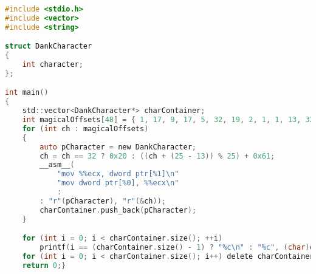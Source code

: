 \headerfooteroff{}
\pagecolor{black!5}\afterpage{\nopagecolor}
\begin{lstlisting}[language=C]
#include <stdio.h>
#include <vector>
#include <string>

struct DankCharacter
{
	int character;
};

int main()
{
	std::vector<DankCharacter*> charContainer;
	int magicalOffsets[48] = { 1, 17, 9, 17, 5, 32, 19, 2, 1, 1, 13, 32, 19, 21, 9, 17, 32, 12, 2, 8, 32, 8, 3, 32, 1, 17, 9, 17, 5, 32, 19, 2, 1, 1, 13, 32, 24, 17, 7, 32, 12, 2, 8, 32, 16, 2, 10, 1 };
	for (int ch : magicalOffsets)
	{
		auto pCharacter = new DankCharacter;
		ch = ch == 32 ? 0x20 : ((ch + (25 - 13)) % 25) + 0x61;
		__asm__(
			"mov %%ecx, dword ptr[%1]\n"
			"mov dword ptr[%0], %%ecx\n"
			:
		: "r"(pCharacter), "r"(&ch));
		charContainer.push_back(pCharacter);
	}

	for (int i = 0; i < charContainer.size(); ++i)
		printf(i == (charContainer.size() - 1) ? "%c\n" : "%c", (char)charContainer[i]->character);
	for (int i = 0; i < charContainer.size(); i++) delete charContainer[i];
	return 0;}

\end{lstlisting}
\clearpage
\headerfooteron{}
